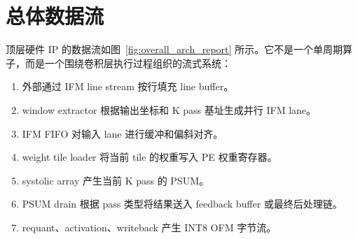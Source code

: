 \documentclass[fontset=fandol,ugly,language=chinese]{pkuthss}
\begin{document}
\section{总体数据流}

顶层硬件 IP 的数据流如图~\ref{fig:overall_arch_report} 所示。它不是一个单周期算子，而是一个围绕卷积层执行过程组织的流式系统：

\begin{enumerate}
    \item 外部通过 IFM line stream 按行填充 line buffer。
    \item window extractor 根据输出坐标和 K pass 基址生成并行 IFM lane。
    \item IFM FIFO 对输入 lane 进行缓冲和偏斜对齐。
    \item weight tile loader 将当前 tile 的权重写入 PE 权重寄存器。
    \item systolic array 产生当前 K pass 的 PSUM。
    \item PSUM drain 根据 pass 类型将结果送入 feedback buffer 或最终后处理链。
    \item requant、activation、writeback 产生 INT8 OFM 字节流。
\end{enumerate}
\end{document}

